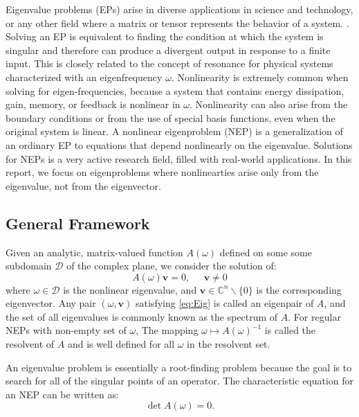 \documentclass[final,leqno,onefignum,onetabnum]{siamltex1213}
\begin{document}
Eigenvalue problems (EPs) arise in diverse applications in science and technology, or any other field where a matrix or tensor represents the behavior of a system. \citep{guillaume_nonlinear_1999, betcke2013nlevp}. Solving an EP is equivalent to finding the condition at which the system is singular and therefore can produce a divergent output in response to a finite input. This is closely related to the concept of resonance for physical systems characterized with an eigenfrequency $\omega$. Nonlinearity is extremely common when solving for eigen-frequencies, because a system that contains energy dissipation, gain, memory, or feedback is nonlinear in $\omega$. Nonlinearity can also arise from the boundary conditions or from the use of special basis functions, even when the original system is linear. A nonlinear eigenproblem (NEP) is a generalization of an ordinary EP to equations that depend nonlinearly on the eigenvalue. Solutions for NEPs is a very active research field, filled with real-world applications. In this report, we focus on eigenproblems where nonlinearties arise only from the eigenvalue, not from the eigenvector.  

\subsection{General Framework}
Given an analytic, matrix-valued function $A(\omega)$ defined on some some subdomain $\mathcal{D}$ of the complex plane, we consider the solution of:
\begin{equation}\label{eq:Eig}
    A(\omega) \mathbf{v} = 0,\;\;\;\;\;\mathbf{v}\neq 0
\end{equation}
where $\omega \in \mathcal{D}$ is the nonlinear eigenvalue, and $\mathbf{v} \in \mathbb{C}^n\backslash\{0\}$ is the corresponding eigenvector. Any pair $(\omega, \mathbf{v})$ satisfying \ref{eq:Eig} is called an eigenpair of $A$, and the set of all eigenvalues is commonly known as the spectrum of $A$. For regular NEPs with non-empty set of $\omega$, The mapping $\omega \mapsto A(\omega)^{-1}$ is called the resolvent of $A$ and is well defined for all $\omega$ in the resolvent set. 

An eigenvalue problem is essentially a root-finding problem because the goal is to search for all of the singular points of an operator. The characteristic equation for an NEP can be written as:
\begin{equation}\label{eq:charNEP}
\det A(\omega) = 0. 
\end{equation}
\end{document}
